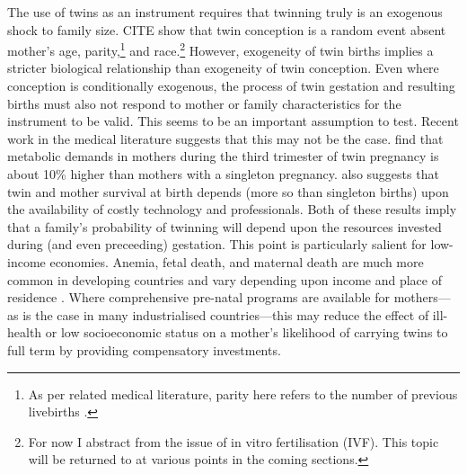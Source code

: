 \documentclass{article}[11pt,subeqn]
\begin{document}
\begin{spacing}{1.25}
The use of twins as an instrument requires that twinning truly is an exogenous shock to family size.  CITE show that twin conception is a random event absent mother's age, parity,\footnote{As per related medical literature, parity here refers to the number of previous livebirths \citep{Elwood1978}.} and race.\footnote{For now I abstract from the issue of in vitro fertilisation (IVF).  This topic will be returned to at various points in the coming sections.} However, exogeneity of twin births implies a stricter biological relationship than exogeneity of twin conception.  Even where conception is conditionally exogenous, the process of twin gestation and resulting births must also not respond to mother or family characteristics for the instrument to be valid.  This seems to be an important assumption to test.  Recent work in the medical literature suggests that this may not be the case. \citet{Shinagawaetal2005} find that metabolic demands in mothers during the third trimester of twin pregnancy is about 10\% higher than mothers with a singleton pregnancy. \citet{Philipson2008}  also suggests that twin and mother survival at birth depends (more so than singleton births) upon the availability of costly technology and professionals.  Both of these results imply that a family's probability of twinning will depend upon the resources invested during (and even preceeding) gestation.  This point is particularly salient for low-income economies.  Anemia, fetal death, and maternal death are much more common in developing countries and vary depending upon income and place of residence \citep{Rush2000}.  Where comprehensive pre-natal programs are available for mothers---as is the case in many industrialised countries---this may reduce the effect of ill-health or low socioeconomic status on a mother's likelihood of carrying twins to full term by providing compensatory investments.


\end{spacing}
\end{document}
